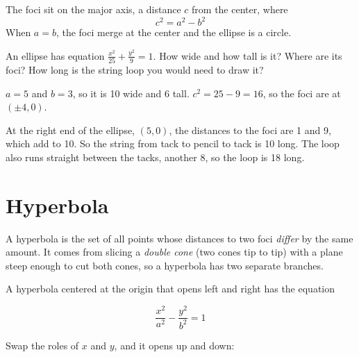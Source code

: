 The foci sit on the major axis, a distance $c$ from the center, where
$$c^2 = a^2 - b^2$$
When $a = b$, the foci merge at the center and the ellipse is a circle.

\begin{center}
\end{center}

\begin{Exercise}[title={Where are the thumbtacks?}, label=conic_ellipse]
An ellipse has equation $\frac{x^2}{25} + \frac{y^2}{9} = 1$. How wide and
how tall is it? Where are its foci? How long is the string loop you would
need to draw it?
\end{Exercise}
\begin{Answer}[ref=conic_ellipse]
$a = 5$ and $b = 3$, so it is 10 wide and 6 tall. $c^2 = 25 - 9 = 16$, so
the foci are at $(\pm 4, 0)$.

At the right end of the ellipse, $(5, 0)$, the distances to the foci are 1
and 9, which add to 10. So the string from tack to pencil to tack is 10
long. The loop also runs straight between the tacks, another 8, so the
loop is 18 long.
\end{Answer}

\section{Hyperbola}

A hyperbola is the set of all points whose distances to
two foci \emph{differ} by the same amount. It comes from slicing a
\emph{double cone} (two cones tip to tip) with a plane steep enough to cut
both cones, so a hyperbola has two separate branches.

A hyperbola centered at the origin that opens left and right has the
equation

\begin{equation}
\frac{x^2}{a^2} - \frac{y^2}{b^2} = 1
\end{equation}

Swap the roles of $x$ and $y$, and it opens up and down:

